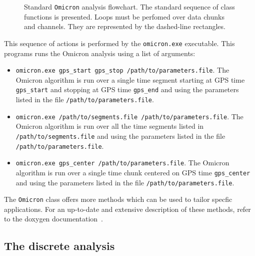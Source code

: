 \begin{figure}
  \center
  \caption{Standard \texttt{Omicron} analysis flowchart. The standard sequence of class functions is presented. Loops must be perfomed over data chunks and channels. They are represented by the dashed-line rectangles.}
  \label{fig:omicron_flowchart}
\end{figure}

This sequence of actions is performed by the \texttt{omicron.exe} executable. This programs runs the Omicron analysis using a list of arguments:
\begin{itemize}
  \item \texttt{omicron.exe gps\_start gps\_stop /path/to/parameters.file}. The Omicron algorithm is run over a single time segment starting at GPS time \texttt{gps\_start} and stopping at GPS time \texttt{gps\_end} and using the parameters listed in the file \texttt{/path/to/parameters.file}.
  \item \texttt{omicron.exe /path/to/segments.file /path/to/parameters.file}. The Omicron algorithm is run over all the time segments listed in \texttt{/path/to/segments.file} and using the parameters listed in the file \texttt{/path/to/parameters.file}.
  \item \texttt{omicron.exe gps\_center /path/to/parameters.file}. The Omicron algorithm is run over a single time chunk centered on GPS time \texttt{gps\_center} and using the parameters listed in the file \texttt{/path/to/parameters.file}.
\end{itemize}
The \texttt{Omicron} class offers more methods which can be used to tailor specfic applications. For an up-to-date and extensive description of these methods, refer to the doxygen documentation~\cite{Omicron_doxygen}.


\subsection{The discrete analysis} \label{sec:algorithm:discrete}

